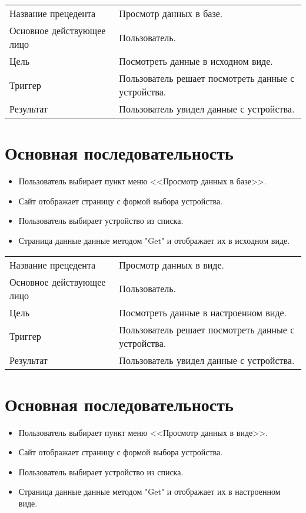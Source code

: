 \begin{table}[]
    \begin{tabular}{ll}
    Название прецедента       & Просмотр данных в базе.\\
    Основное действующее лицо & Пользователь.\\
    Цель                      & Посмотреть данные в исходном виде.\\
    Триггер                   & Пользователь решает посмотреть данные с устройства.\\
    Результат                 & Пользователь увидел данные с устройства.
    \end{tabular}
\end{table}

\section{Основная последовательность}
\begin{itemize}
    \item Пользователь выбирает пункт меню <<Просмотр данных в базе>>.
    \item Сайт отображает страницу с формой выбора устройства.
    \item Пользователь выбирает устройство из списка.
    \item Страница данные данные методом "Get" и отображает их в исходном виде. 
\end{itemize}

\begin{table}[]
    \begin{tabular}{ll}
    Название прецедента       & Просмотр данных в виде.\\
    Основное действующее лицо & Пользователь.\\
    Цель                      & Посмотреть данные в настроенном виде.\\
    Триггер                   & Пользователь решает посмотреть данные с устройства.\\
    Результат                 & Пользователь увидел данные с устройства.
    \end{tabular}
\end{table}

\section{Основная последовательность}
\begin{itemize}
    \item Пользователь выбирает пункт меню <<Просмотр данных в виде>>.
    \item Сайт отображает страницу с формой выбора устройства.
    \item Пользователь выбирает устройство из списка.
    \item Страница данные данные методом "Get" и отображает их в настроенном виде. 
\end{itemize}

